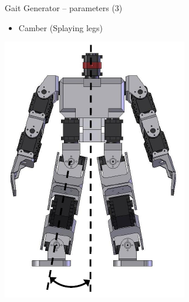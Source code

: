 \documentclass[compress]{beamer}
\begin{document}
\begin{frame}{Gait Generator -- parameters (3)}

    \begin{itemize}

        \item Camber (Splaying legs)
    \end{itemize}
    \begin{center}
        \includegraphics[height=0.5\paperheight]{bioloid-gait-3}
    \end{center}

\end{frame}
\end{document}

